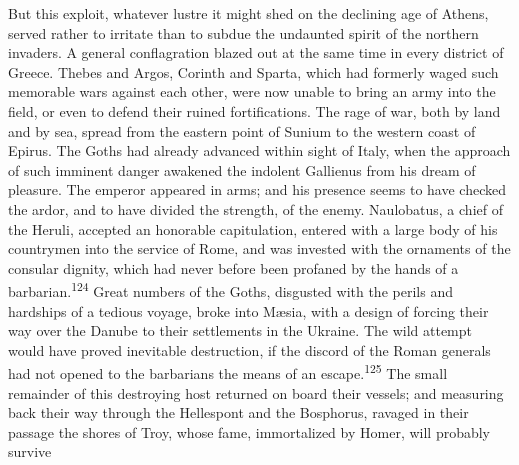 


But this exploit, whatever lustre it might shed on the declining
age of Athens, served rather to irritate than to subdue the
undaunted spirit of the northern invaders. A general
conflagration blazed out at the same time in every district of
Greece. Thebes and Argos, Corinth and Sparta, which had formerly
waged such memorable wars against each other, were now unable to
bring an army into the field, or even to defend their ruined
fortifications. The rage of war, both by land and by sea, spread
from the eastern point of Sunium to the western coast of Epirus.
The Goths had already advanced within sight of Italy, when the
approach of such imminent danger awakened the indolent Gallienus
from his dream of pleasure. The emperor appeared in arms; and his
presence seems to have checked the ardor, and to have divided the
strength, of the enemy. Naulobatus, a chief of the Heruli,
accepted an honorable capitulation, entered with a large body of
his countrymen into the service of Rome, and was invested with
the ornaments of the consular dignity, which had never before
been profaned by the hands of a barbarian.\textsuperscript{124} Great numbers of
the Goths, disgusted with the perils and hardships of a tedious
voyage, broke into Mæsia, with a design of forcing their way over
the Danube to their settlements in the Ukraine. The wild attempt
would have proved inevitable destruction, if the discord of the
Roman generals had not opened to the barbarians the means of an
escape.\textsuperscript{125} The small remainder of this destroying host returned
on board their vessels; and measuring back their way through the
Hellespont and the Bosphorus, ravaged in their passage the shores
of Troy, whose fame, immortalized by Homer, will probably survive
